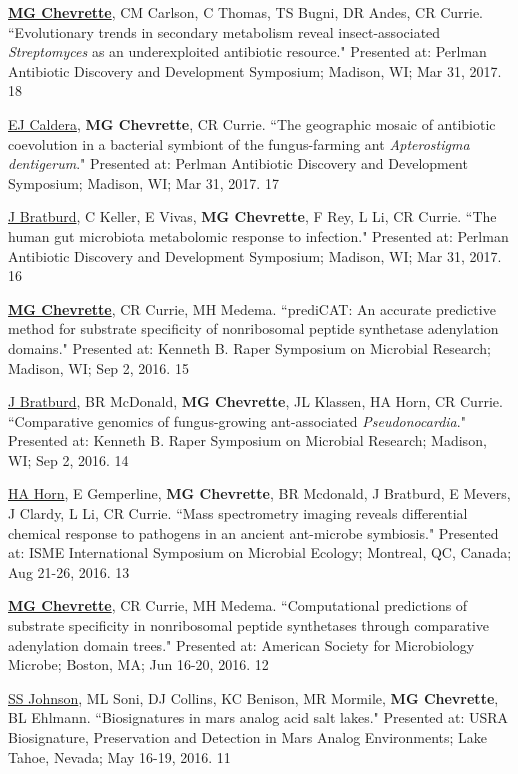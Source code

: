 \begin{cvpubs}
\cvpub
{\underline{\textbf{MG Chevrette}}, CM Carlson, C Thomas, TS Bugni, DR Andes, CR Currie. ``Evolutionary trends in secondary metabolism reveal insect-associated \textit{Streptomyces} as an underexploited antibiotic resource." Presented at: Perlman Antibiotic Discovery and Development Symposium; Madison, WI; Mar 31, 2017.}
{18}

\cvpub
{\underline{EJ Caldera}, \textbf{MG Chevrette}, CR Currie. ``The geographic mosaic of antibiotic coevolution in a bacterial symbiont of the fungus-farming ant \textit{Apterostigma dentigerum}." Presented at: Perlman Antibiotic Discovery and Development Symposium; Madison, WI; Mar 31, 2017.}
{17}

\cvpub
{\underline{J Bratburd}, C Keller, E Vivas, \textbf{MG Chevrette}, F Rey, L Li, CR Currie. ``The human gut microbiota metabolomic response to infection." Presented at: Perlman Antibiotic Discovery and Development Symposium; Madison, WI; Mar 31, 2017.}
{16}

\cvpub
{\textbf{\underline{MG Chevrette}}, CR Currie, MH Medema.  ``prediCAT: An accurate predictive method for substrate specificity of nonribosomal peptide synthetase adenylation domains." Presented at: Kenneth B. Raper Symposium on Microbial Research; Madison, WI; Sep 2, 2016.}
{15}

\cvpub
{\underline{J Bratburd}, BR McDonald, \textbf{MG Chevrette}, JL Klassen, HA Horn, CR Currie. ``Comparative genomics of fungus-growing ant-associated \textit{Pseudonocardia}." Presented at: Kenneth B. Raper Symposium on Microbial Research; Madison, WI; Sep 2, 2016.}
{14}

\cvpub
{\underline{HA Horn}, E Gemperline, \textbf{MG Chevrette}, BR Mcdonald, J Bratburd, E Mevers, J Clardy, L Li, CR Currie. ``Mass spectrometry imaging reveals differential chemical response to pathogens in an ancient ant-microbe symbiosis." Presented at: ISME International Symposium on Microbial Ecology; Montreal, QC, Canada; Aug 21-26, 2016.}
{13}

\cvpub
{\textbf{\underline{MG Chevrette}}, CR Currie, MH Medema.  ``Computational predictions of substrate specificity in nonribosomal peptide synthetases through comparative adenylation domain trees." Presented at: American Society for Microbiology Microbe; Boston, MA; Jun 16-20, 2016.}
{12}

\cvpub
{\underline{SS Johnson}, ML Soni, DJ Collins, KC Benison, MR Mormile, \textbf{MG Chevrette}, BL Ehlmann. ``Biosignatures in mars analog acid salt lakes." Presented at: USRA Biosignature, Preservation and Detection in Mars Analog Environments; Lake Tahoe, Nevada; May 16-19, 2016.}
{11}


\end{cvpubs}
